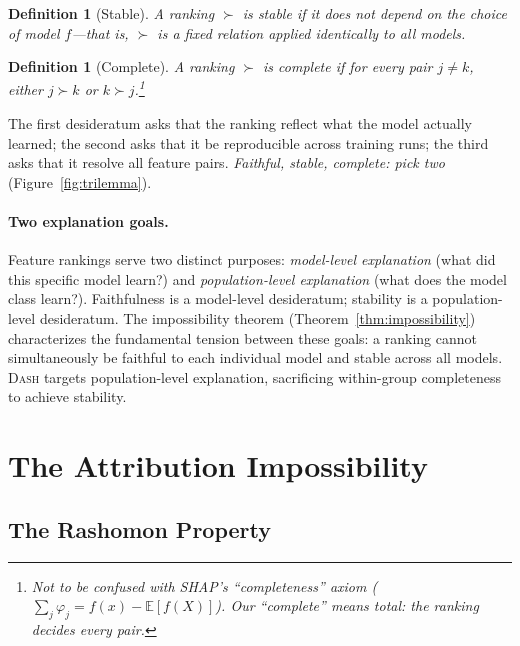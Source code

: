 \documentclass{article}
\newtheorem{definition}[theorem]{Definition}
\newcommand{\E}{\mathbb{E}}
\newcommand{\DASH}{\textsc{Dash}}
\begin{document}
\begin{definition}[Stable]
\label{def:stable}
A ranking $\succ$ is \emph{stable} if it does not depend on the choice of model $f$---that is, $\succ$ is a fixed relation applied identically to all models.
\end{definition}

\begin{definition}[Complete]
\label{def:complete}
A ranking $\succ$ is \emph{complete} if for every pair $j \neq k$, either $j \succ k$ or $k \succ j$.\footnote{Not to be confused with SHAP's ``completeness'' axiom ($\sum_j \varphi_j = f(x) - \E[f(X)]$). Our ``complete'' means \emph{total}: the ranking decides every pair.}
\end{definition}

The first desideratum asks that the ranking reflect what the model actually learned; the second asks that it be reproducible across training runs; the third asks that it resolve all feature pairs.
\emph{Faithful, stable, complete: pick two} (Figure~\ref{fig:trilemma}).

\paragraph{Two explanation goals.}
Feature rankings serve two distinct purposes: \emph{model-level explanation} (what did this specific model learn?) and \emph{population-level explanation} (what does the model class learn?).
Faithfulness is a model-level desideratum; stability is a population-level desideratum.
The impossibility theorem (Theorem~\ref{thm:impossibility}) characterizes the fundamental tension between these goals: a ranking cannot simultaneously be faithful to each individual model and stable across all models.
\DASH{} targets population-level explanation, sacrificing within-group completeness to achieve stability.


\section{The Attribution Impossibility}
\label{sec:impossibility}

\subsection{The Rashomon Property}
\label{sec:rashomon}
\end{document}
